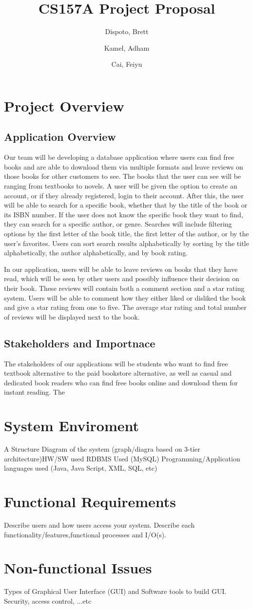 \documentclass[titlepage]{article}
\author{ Dispoto, Brett\\
	\and
	Kamel, Adham\\
	\and
	Cai, Feiyu\\
}
\title{CS157A Project Proposal}
\begin{document}
	\maketitle

	\section{Project Overview}
	\subsection{Application Overview}
	Our team will be developing a database application where users can find free books and are able to download them via multiple formats and leave reviews on those books for other customers to see. The books that the user can see will be ranging from textbooks to novels. A user will be given the option to create an account, or if they already registered, login to their account. After this, the user will be able to search for a specific book, whether that by the title of the book or its ISBN number. If the user does not know the specific book they want to find, they can search for a specific author, or genre. Searches will include filtering options by the first letter of the book title, the first letter of the author, or by the user's favorites. Users can sort search results alphabetically by sorting by the title alphabetically, the author alphabetically, and by book rating.


	In our application, users will be able to leave reviews on books that they have read, which will be seen by other users and possibly influence their decision on their book. These reviews will contain both a comment section and a star rating system. Users will be able to comment how they either liked or disliked the book and give a star rating from one to five. The average star rating and total number of reviews will be displayed next to the book.
	\subsection{Stakeholders and Importnace}
	The stakeholders of our applications will be students who want to find free textbook alternative to the paid bookstore alternative, as well as casual and dedicated book readers who can find free books online and download them for instant reading. The

	\section{System Enviroment}
	A Structure Diagram of the system (graph/diagra based on 3-tier architecture)HW/SW used RDBMS Used (MySQL) Programming/Application
languages used (Java, Java Script,  XML, SQL, etc)
	\section{Functional Requirements}
	Describe users and how users access your system. Describe each functionality/features,functional processes and I/O(s).
	\section{Non-functional Issues}
Types of Graphical User Interface (GUI) and Software tools to build GUI. Security, access control, ...etc
\end{document}

